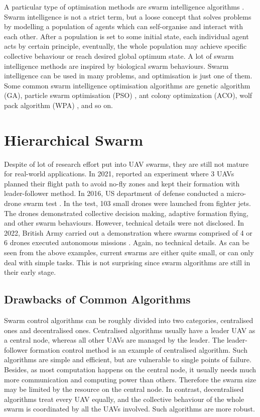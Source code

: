 A particular type of optimisation methods are swarm intelligence algorithms
\parencite{Cao2024, Javed2024, Tang2023, Peng2021, Zhou2020, Tan2013, Beni1993}.
Swarm intelligence is not a strict term,
but a loose concept that solves problems by modelling a population of agents
which can self-organise and interact with each other.
After a population is set to some initial state,
each individual agent acts by certain principle,
eventually, the whole population may achieve specific collective behaviour
or reach desired global optimum state.
A lot of swarm intelligence methods are inspired by biological swarm behaviours.
Swarm intelligence can be used in many problems, and optimisation is just one of them.
Some common swarm intelligence optimisation algorithms are genetic algorithm (GA),
particle swarm optimisation (PSO) \parencite{Bonyadi2017, Duan2013, Roberge2013},
ant colony optimization (ACO),
wolf pack algorithm (WPA) \parencite{Xu2022, Lu2020},
and so on.

\section{Hierarchical Swarm}

Despite of lot of research effort put into UAV swarms,
they are still not mature for real-world applications.
In 2021, \textcite{Lee2021} reported an experiment where
3 UAVs planned their flight path to avoid no-fly zones and
kept their formation with leader-follower method.
In 2016, US department of defense conducted a micro-drone swarm test \parencite{DOD2017}.
In the test, 103 small drones were launched from fighter jets.
The drones demonstrated collective decision making,
adaptive formation flying, and other swarm behaviours.
However, technical details were not disclosed.
In 2022, British Army carried out a demonstration where
swarms comprised of 4 or 6 drones executed autonomous missions \parencite{BA2022}.
Again, no technical details.
As can be seen from the above examples,
current swarms are either quite small, or can only deal with simple tasks.
This is not surprising since swarm algorithms are still in their early stage.

\subsection{Drawbacks of Common Algorithms}

Swarm control algorithms can be roughly divided into two categories,
centralised ones and decentralised ones.
Centralised algorithms usually have a leader UAV as a central node,
whereas all other UAVs are managed by the leader.
The leader-follower formation control method is an example of centralised algorithm.
Such algorithms are simple and efficient,
but are vulnerable to single points of failure.
Besides, as most computation happens on the central node,
it usually needs much more communication and computing power than others.
Therefore the swarm size may be limited by the resource on the central node.
In contrast, decentralised algorithms treat every UAV equally,
and the collective behaviour of the whole swarm is coordinated by all the UAVs involved.
Such algorithms are more robust.

